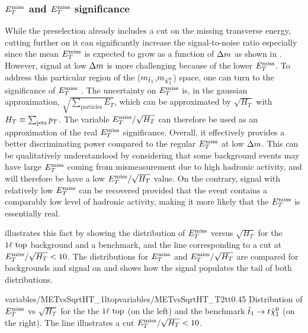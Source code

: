            \subsubsection{$E_T^\text{miss}$ and $E_T^\text{miss}$ significance}

        While the preselection already includes a cut on the missing transverse energy,
        cutting further on it can significantly increase the signal-to-noise ratio especially
        since the mean $E_T^\text{miss}$ is expected to grow as a function of $\Delta m$ as shown
        in . However, signal
        at low $\Delta m$ is more challenging because of the lower $E_T^\text{miss}$. To address this
        particular region of the ($m_{\tilde{t}_1}$,$m_{\tilde{\chi}_1^0}$) space, one
        can turn to the significance of $E_T^\text{miss}$ \cite{METperf, METsignificanceMirman}. The
        uncertainty on $E_T^\text{miss}$ is, in the gaussian approximation, $\sqrt{\sum_\text{particles} E_T}$,
        which can be approximated by $\sqrt{H_T}$ with $H_T \equiv \sum_\text{jets} p_T$.
        The variable $E_T^\text{miss} / \sqrt{H_T}$ can therefore be used as an approximation of the
        real $E_T^\text{miss}$ significance. Overall, it effectively provides a better discriminating
        power compared to the regular $E_T^\text{miss}$ at low $\Delta m$. This can be qualitatively understandood
        by considering that some background events may have large $E_T^\text{miss}$ coming
        from mismeasurement due to high hadronic activity, and will therefore be have
        a low $E_T^\text{miss}/\sqrt{H_T}$ value. On the contrary, signal with relatively low $E_T^\text{miss}$
        can be recovered provided that the event contains a comparably low level of hadronic
        activity, making it more likely that the $E_T^\text{miss}$ is essentially real.

         illustrates this fact by showing the distribution of
        $E_T^\text{miss}$ versus $\sqrt{H_T}$ for the $1\ell~\text{top}$ background and a benchmark, and
        the line corresponding to a cut at $E_T^\text{miss} / \sqrt{H_T} < 10$. The distributions
        for $E_T^\text{miss}$ and $E_T^\text{miss} / \sqrt{H_T}$ are compared for backgrounds and signal on
         and shows how the signal populates the
        tail of both distributions.

                         {variables/METvsSqrtHT_1ltop}{variables/METvsSqrtHT_T2tt}{0.45}
                         {Distribution of $E_T^\text{miss}$ vs $\sqrt{H_T}$ for the the
                         $1\ell~\text{top}$ (on the left) and the benchmark $\tilde{t}_1 \rightarrow
                         t \tilde{\chi}_1^0$ (on the right).
                         The line illustrates a cut $E_T^\text{miss} / \sqrt{H_T} < 10$.}

